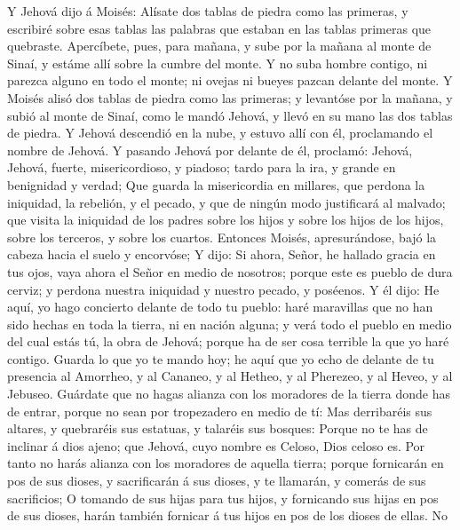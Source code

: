  Y Jehová dijo á Moisés: Alísate dos tablas de piedra como
las primeras, y escribiré sobre esas tablas las palabras que estaban en
las tablas primeras que quebraste.  Apercíbete, pues, para
mañana, y sube por la mañana al monte de Sinaí, y estáme allí sobre la
cumbre del monte.  Y no suba hombre contigo, ni parezca
alguno en todo el monte; ni ovejas ni bueyes pazcan delante del monte.
 Y Moisés alisó dos tablas de piedra como las primeras; y
levantóse por la mañana, y subió al monte de Sinaí, como le mandó
Jehová, y llevó en su mano las dos tablas de piedra.  Y
Jehová descendió en la nube, y estuvo allí con él, proclamando el nombre
de Jehová.  Y pasando Jehová por delante de él, proclamó:
Jehová, Jehová, fuerte, misericordioso, y piadoso; tardo para la ira, y
grande en benignidad y verdad;  Que guarda la misericordia
en millares, que perdona la iniquidad, la rebelión, y el pecado, y que
de ningún modo justificará al malvado; que visita la iniquidad de los
padres sobre los hijos y sobre los hijos de los hijos, sobre los
terceros, y sobre los cuartos.  Entonces Moisés,
apresurándose, bajó la cabeza hacia el suelo y encorvóse; 
Y dijo: Si ahora, Señor, he hallado gracia en tus ojos, vaya ahora el
Señor en medio de nosotros; porque este es pueblo de dura cerviz; y
perdona nuestra iniquidad y nuestro pecado, y poséenos. 
Y él dijo: He aquí, yo hago concierto delante de todo tu pueblo: haré
maravillas que no han sido hechas en toda la tierra, ni en nación
alguna; y verá todo el pueblo en medio del cual estás tú, la obra de
Jehová; porque ha de ser cosa terrible la que yo haré contigo.
 Guarda lo que yo te mando hoy; he aquí que yo echo de
delante de tu presencia al Amorrheo, y al Cananeo, y al Hetheo, y al
Pherezeo, y al Heveo, y al Jebuseo.  Guárdate que no
hagas alianza con los moradores de la tierra donde has de entrar, porque
no sean por tropezadero en medio de tí:  Mas derribaréis
sus altares, y quebraréis sus estatuas, y talaréis sus bosques:
 Porque no te has de inclinar á dios ajeno; que Jehová,
cuyo nombre es Celoso, Dios celoso es.  Por tanto no
harás alianza con los moradores de aquella tierra; porque fornicarán en
pos de sus dioses, y sacrificarán á sus dioses, y te llamarán, y comerás
de sus sacrificios;  O tomando de sus hijas para tus
hijos, y fornicando sus hijas en pos de sus dioses, harán también
fornicar á tus hijos en pos de los dioses de ellas.  No
